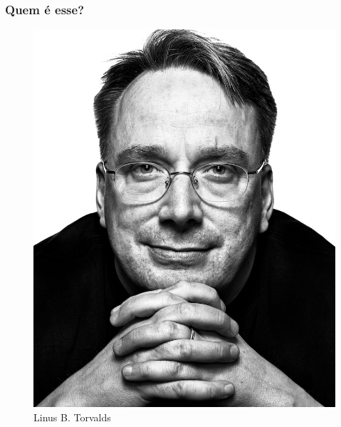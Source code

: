 \documentclass[xcolor=dvipsnames]{beamer}
\begin{document}
\begin{frame}
	\frametitle{Quem é esse?}
	\begin{figure}
	\begin{center}
	\includegraphics[scale=0.6]{lbt.jpg}\\
	\pause
	Linus B. Torvalds
	\end{center}
	\end{figure}
\end{frame}
\end{document}
